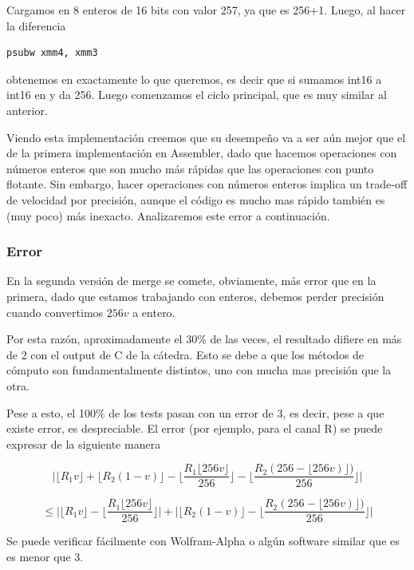 Cargamos en  8 enteros de 16 bits con valor 257, ya que es 256+1.
Luego, al hacer la diferencia

\begin{lstlisting}
psubw xmm4, xmm3
\end{lstlisting}

obtenemos en  exactamente lo que queremos, es decir que si sumamos int16 a int16 en  y  da 256. Luego comenzamos el ciclo principal, que es muy similar al anterior.

Viendo esta implementación creemos que su desempeño va a ser aún mejor que el de la primera implementación en Assembler, dado que hacemos operaciones con números enteros que son mucho más rápidas que las operaciones con punto flotante. Sin embargo, hacer operaciones con números enteros implica un trade-off de velocidad por precisión, aunque el código es mucho mas rápido también es (muy poco) más inexacto. Analizaremos este error a continuación.

\subsubsection{Error}

En la segunda versión de merge se comete, obviamente, más error que en la primera, dado que estamos trabajando con enteros, debemos perder precisión cuando convertimos $256v$ a entero.

Por esta razón, aproximadamente el 30\% de las veces, el resultado difiere en más de 2 con el output de C de la cátedra. Esto se debe a que los métodos de cómputo son fundamentalmente distintos, uno con mucha mas precisión que la otra.

Pese a esto, el 100\% de los tests pasan con un error de 3, es decir, pese a que existe error, es despreciable. El error (por ejemplo, para el canal R) se puede expresar de la siguiente manera

$$\bigg|\lfloor R_1v\rfloor + \lfloor R_2(1-v) \rfloor
  -\bigg\lfloor \frac{R_1\lfloor 256v \rfloor}{256} \bigg\rfloor 
 -\bigg\lfloor \frac{R_2(256- \lfloor 256v) \rfloor)}{256} \bigg\rfloor\bigg| $$


$$\leq
\bigg|
\lfloor R_1v\rfloor - \bigg\lfloor \frac{R_1\lfloor 256v \rfloor}{256} \bigg\rfloor
\bigg|
+
\bigg|
\lfloor R_2(1-v) \rfloor -\bigg\lfloor \frac{R_2(256- \lfloor 256v) \rfloor)}{256} \bigg\rfloor
\bigg| $$

Se puede verificar fácilmente con Wolfram-Alpha o algún software similar que es es menor que 3.


